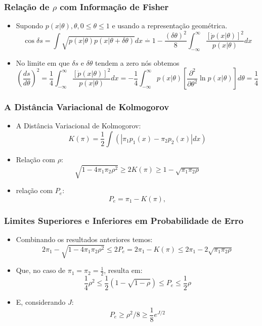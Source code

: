 \documentclass{beamer}
\begin{document}
\begin{frame}
	\frametitle{Relação de $\rho$ com Informação de Fisher}

	\begin{itemize}

		\item[] Supondo $ p(x|\theta), \theta, 0 \leq \theta \leq 1$ e usando a representação geométrica.
		$$ \cos \delta s = \int \sqrt{p(x|\theta)p(x|\theta+ \delta\theta)}dx \stackrel{.}{=} 1 - \frac{(\delta \theta)^2}{8} \int_{-\infty}^{\infty} \frac{[\dot{p}(x|\theta)]^2}{p(x|\theta)} dx $$
		\item[] No limite em que $\delta s$ e $\delta \theta$ tendem a zero nós obtemos
		$$ (\frac{ds}{d\theta})^2 = \frac{1}{4} \int_{-\infty}^{\infty} \frac{[\dot{p}(x|\theta)]^2}{p(x|\theta)} dx  = - \frac{1}{4} \int_{-\infty}^{\infty} p(x|\theta) [\frac{\partial^2}{\partial \theta^2} \ln p(x|\theta)] d\theta = \frac{1}{4} $$
	
	\end{itemize}
	
\end{frame}



\begin{frame}
    \frametitle{A Distância Variacional de Kolmogorov} 

	\begin{itemize}
		\item A Distância Variacional de Kolmogorov:
		$$ K(\pi) = \frac{1}{2}\int (|\pi_1p_1(x)-\pi_2p_2(x)|dx) $$
		\item Relação com $\rho$:
		$$ \sqrt{1-4\pi_1\pi_2\rho^2} \geq 2K(\pi) \geq 1 - \sqrt{\pi_1\pi_2\rho} $$
		\item relação com $P_e$:
		$$ P_e = \pi_1 - K(\pi),  $$	
		
	\end{itemize}
    
\end{frame}



\begin{frame}
    \frametitle{Limites Superiores e Inferiores em Probabilidade de Erro}
    
    \begin{itemize}
		\item[] Combinando os resultados anteriores temos:
		$$ 2\pi_1 - \sqrt{1-4\pi_1\pi_2\rho^2} \leq 2P_e =  2\pi_1  - K(\pi) \leq 2\pi_1 - 2\sqrt{\pi_1\pi_2\rho} $$    
    
    	\item[] Que, no caso de $\pi_1 = \pi_2 = \frac{1}{2}$, resulta em:
    	$$ \frac{1}{4} \rho^2 \leq \frac{1}{2} (1-\sqrt{1-\rho}) \leq P_e \leq \frac{1}{2}\rho $$
    	\item[] E, considerando $J$:
    	$$ P_e \geq \rho^2/8 \geq \frac{1}{8} e^{J/2} $$
    \end{itemize}
    
\end{frame}
\end{document}
